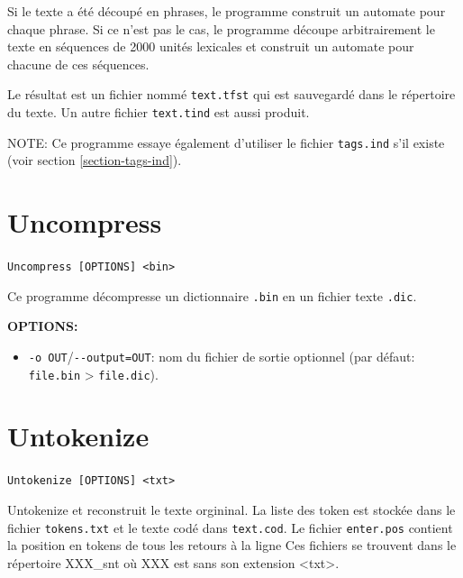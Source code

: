 \bigskip
\noindent Si le texte a été découpé en phrases, le programme construit un automate pour chaque
phrase. Si ce n’est pas le cas, le programme découpe arbitrairement le texte en séquences de
2000 unités lexicales et construit un automate pour chacune de ces séquences.

\bigskip
\noindent Le résultat est un fichier nommé \verb+text.tfst+ qui est sauvegardé dans le répertoire du
texte. Un autre fichier \verb+text.tind+ est aussi produit.

\bigskip
\noindent NOTE: Ce programme essaye également d'utiliser le fichier \verb+tags.ind+ s'il existe
(voir section \ref{section-tags-ind}).







\section{Uncompress}
\label{section-Uncompress}
\verb+Uncompress [OPTIONS] <bin>+

\bigskip
\noindent Ce programme décompresse un dictionnaire \verb+.bin+ en un fichier texte
\verb+.dic+.

\bigskip
\noindent \textbf{OPTIONS:}
\begin{itemize}
\item \verb+-o OUT+/\verb+--output=OUT+: nom du fichier de sortie optionnel (par défaut:
  \verb+file.bin+ > \verb+file.dic+).
\end{itemize}








\section{Untokenize}
\label{section-Untokenize}
\verb+Untokenize [OPTIONS] <txt>+

\bigskip
\noindent Untokenize et reconstruit le texte orgininal. La liste des token est stockée dans le
fichier \verb+tokens.txt+ et le texte codé dans \verb+text.cod+.
Le fichier \verb+enter.pos+ contient la position en tokens de tous les retours à la ligne
Ces fichiers se trouvent dans le répertoire XXX\_snt où XXX est sans son extension <txt>.

